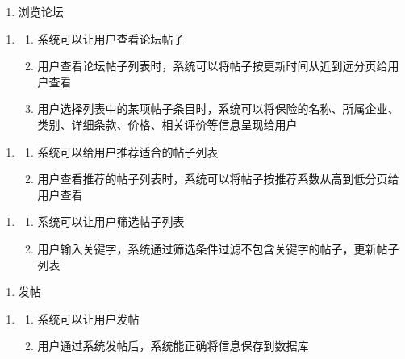 \documentclass[a4paper]{ctexart}
\begin{document}
\begin{enumerate}[label=UR5.]
  \item 浏览论坛
\end{enumerate}
\begin{enumerate}[label=SR8.]
  \item 
  \begin{enumerate}[label=\arabic*).]
    \item 系统可以让用户查看论坛帖子
    \item 用户查看论坛帖子列表时，系统可以将帖子按更新时间从近到远分页给用户查看
    \item 用户选择列表中的某项帖子条目时，系统可以将保险的名称、所属企业、类别、详细条款、价格、相关评价等信息呈现给用户
  \end{enumerate}
\end{enumerate}
\begin{enumerate}[label=SR9.]
  \item 
  \begin{enumerate}[label=\arabic*).]
    \item 系统可以给用户推荐适合的帖子列表
    \item 用户查看推荐的帖子列表时，系统可以将帖子按推荐系数从高到低分页给用户查看
  \end{enumerate}
\end{enumerate}
\begin{enumerate}[label=SR10.]
  \item 
  \begin{enumerate}[label=\arabic*).]
    \item 系统可以让用户筛选帖子列表
    \item 用户输入关键字，系统通过筛选条件过滤不包含关键字的帖子，更新帖子列表
  \end{enumerate}
\end{enumerate}

\begin{enumerate}[label=UR6.]
  \item 发帖
\end{enumerate}
\begin{enumerate}[label=SR11.]
  \item 
  \begin{enumerate}[label=\arabic*).]
    \item 系统可以让用户发帖
    \item 用户通过系统发帖后，系统能正确将信息保存到数据库
  \end{enumerate}
\end{enumerate}
\end{document}
